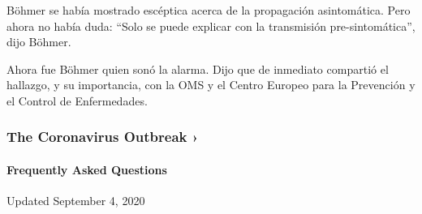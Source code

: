Böhmer se había mostrado escéptica acerca de la propagación
asintomática. Pero ahora no había duda: ``Solo se puede explicar con la
transmisión pre-sintomática'', dijo Böhmer.

Ahora fue Böhmer quien sonó la alarma. Dijo que de inmediato compartió
el hallazgo, y su importancia, con la OMS y el Centro Europeo para la
Prevención y el Control de Enfermedades.

\href{https://www.nytimes3xbfgragh.onion/news-event/coronavirus?action=click\&pgtype=Article\&state=default\&region=MAIN_CONTENT_3\&context=storylines_faq}{}

\hypertarget{the-coronavirus-outbreak-}{%
\subsubsection{The Coronavirus Outbreak
›}\label{the-coronavirus-outbreak-}}

\hypertarget{frequently-asked-questions}{%
\paragraph{Frequently Asked
Questions}\label{frequently-asked-questions}}

Updated September 4, 2020

